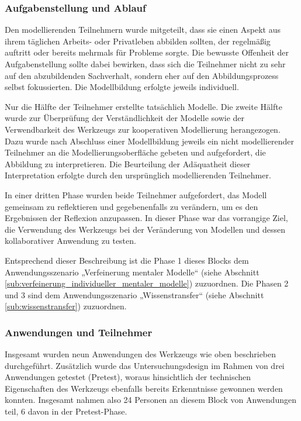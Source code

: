 
\subsubsection{Aufgabenstellung und Ablauf} %
\label{ssub:1_aufgabenstellung}

Den modellierenden Teilnehmern wurde mitgeteilt, dass sie einen Aspekt aus ihrem täglichen Arbeits- oder Privatleben abbilden sollten, der regelmäßig auftritt oder bereits mehrmals für Probleme sorgte. Die bewusste Offenheit der Aufgabenstellung sollte dabei bewirken, dass sich die Teilnehmer nicht zu sehr auf den abzubildenden Sachverhalt, sondern eher auf den Abbildungsprozess selbst fokussierten. Die Modellbildung erfolgte jeweils individuell.

Nur die Hälfte der Teilnehmer erstellte tatsächlich Modelle. Die zweite Hälfte wurde zur Überprüfung der Verständlichkeit der Modelle sowie der Verwendbarkeit des Werkzeugs zur kooperativen Modellierung herangezogen. Dazu wurde nach Abschluss einer Modellbildung jeweils ein nicht modellierender Teilnehmer an die Modellierungsoberfläche gebeten und aufgefordert, die Abbildung zu interpretieren. Die Beurteilung der Adäquatheit dieser Interpretation erfolgte durch den ursprünglich modellierenden Teilnehmer.

In einer dritten Phase wurden beide Teilnehmer aufgefordert, das Modell gemeinsam zu reflektieren und gegebenenfalls zu verändern, um es den Ergebnissen der Reflexion anzupassen. In dieser Phase war das vorrangige Ziel, die Verwendung des Werkzeugs bei der Veränderung von Modellen und dessen kollaborativer Anwendung zu testen. 

Entsprechend dieser Beschreibung ist die Phase 1 dieses Blocks dem Anwendungsszenario „Verfeinerung mentaler Modelle“ (siehe Abschnitt \ref{sub:verfeinerung_individueller_mentaler_modelle}) zuzuordnen. Die Phasen 2 und 3 sind dem Anwendungsszenario „Wissenstransfer“ (siehe Abschnitt \ref{sub:wissenstransfer}) zuzuordnen.


\subsubsection{Anwendungen und Teilnehmer} %
\label{ssub:1_teilnehmer}

Insgesamt wurden neun Anwendungen des Werkzeugs wie oben beschrieben durchgeführt. Zusätzlich wurde das Untersuchungsdesign im Rahmen von drei Anwendungen getestet (Pretest), woraus hinsichtlich der technischen Eigenschaften des Werkzeugs ebenfalls bereits Erkenntnisse gewonnen werden konnten. Insgesamt nahmen also 24 Personen an diesem Block von Anwendungen teil, 6 davon in der Pretest-Phase.

